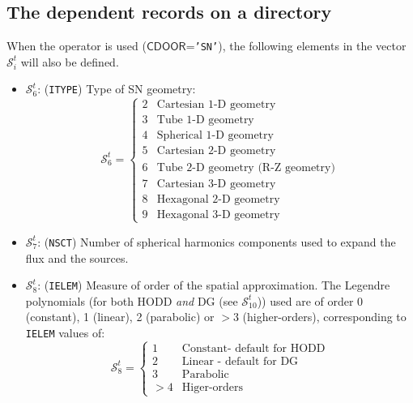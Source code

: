 \subsection{The  dependent records on a  directory}\label{sect:sntrackingdir}

When the  operator is used ($\mathsf{CDOOR}$={\tt 'SN'}), the following elements in the vector
$\mathcal{S}^{t}_{i}$ will also be defined.

\begin{itemize}
\item $\mathcal{S}^{t}_{6}$: ({\tt ITYPE}) Type of SN geometry:
\begin{displaymath}
\mathcal{S}^{t}_{6} = \left\{
\begin{array}{rl}
 2 & \textrm{Cartesian 1-D geometry} \\
 3 & \textrm{Tube 1-D geometry} \\
 4 & \textrm{Spherical 1-D geometry} \\
 5 & \textrm{Cartesian 2-D geometry} \\
 6 & \textrm{Tube 2-D geometry (R-Z geometry)} \\
 7 & \textrm{Cartesian 3-D geometry} \\
 8 & \textrm{Hexagonal 2-D geometry} \\
 9 & \textrm{Hexagonal 3-D geometry}
\end{array} \right.
\end{displaymath}

\item $\mathcal{S}^{t}_{7}$: ({\tt NSCT}) Number of spherical harmonics components used to expand the flux and the sources.

\item $\mathcal{S}^{t}_{8}$: ({\tt IELEM}) Measure of order of the spatial approximation. The Legendre polynomials (for both HODD \emph{and} DG (see $\mathcal{S}^{t}_{10}$)) used are of order 0 (constant), 1 (linear), 2 (parabolic) or $>$3 (higher-orders), corresponding to {\tt IELEM} values of:
\begin{displaymath}
\mathcal{S}^{t}_{8} = \left\{
\begin{array}{rl}
 1 & \textrm{Constant- default for HODD} \\
 2 & \textrm{Linear - default for DG} \\
 3 & \textrm{Parabolic} \\
 >4 & \textrm{Higer-orders}
\end{array} \right.
\end{displaymath}


\end{itemize}
